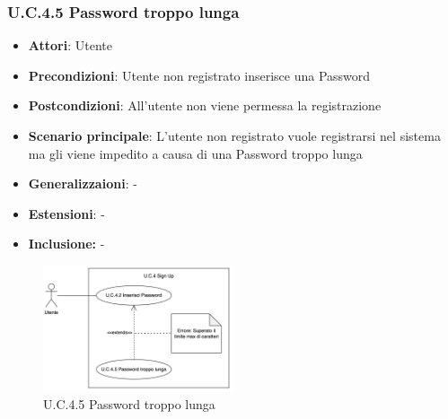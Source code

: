 \subsubsection{U.C.4.5 Password troppo lunga}
\begin{itemize}
    \item \textbf{Attori}: Utente
    \item \textbf{Precondizioni}: Utente non registrato inserisce una Password
    \item \textbf{Postcondizioni}: All'utente non viene permessa la registrazione
    \item \textbf{Scenario principale}: L’utente non registrato vuole registrarsi nel sistema ma gli viene impedito a causa di una Password troppo lunga
    \item \textbf{Generalizzaioni}: -
    \item \textbf{Estensioni}: -
    \item \textbf{Inclusione:} -
\end{itemize}
\begin{figure}[h!]
    \centering
    \includegraphics[width=0.5\textwidth]{img/UC4-5.png}
    \caption{U.C.4.5 Password troppo lunga}
\end{figure}
